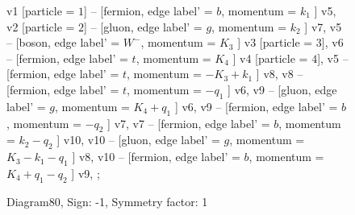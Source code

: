\documentclass{revtex4}
\begin{document}
\begin{figure}[!htb]
\begin{center}
{    %
v1 [particle = \(1\)] -- [fermion, edge label' = \(b\), momentum = \(k_{1}\) ] v5, 
v2 [particle = \(2\)] -- [gluon, edge label' = \(g\), momentum = \(k_{2}\) ] v7, 
v5 -- [boson, edge label' = \(W^{-}\), momentum = \(K_{3}\) ] v3 [particle = \(3\)], 
v6 -- [fermion, edge label' = \(t\), momentum = \(K_{4}\) ] v4 [particle = \(4\)], 
v5 -- [fermion, edge label' = \(t\), momentum = \(-K_{3} + k_{1}\) ] v8, 
v8 -- [fermion, edge label' = \(t\), momentum = \(-q_{1}\) ] v6, 
v9 -- [gluon, edge label' = \(g\), momentum = \(K_{4} + q_{1}\) ] v6, 
v9 -- [fermion, edge label' = \(b\), momentum = \(-q_{2}\) ] v7, 
v7 -- [fermion, edge label' = \(b\), momentum = \(k_{2} - q_{2}\) ] v10, 
v10 -- [gluon, edge label' = \(g\), momentum = \(K_{3} - k_{1} - q_{1}\) ] v8, 
v10 -- [fermion, edge label' = \(b\), momentum = \(K_{4} + q_{1} - q_{2}\) ] v9, 
};
\end{center}
\caption{Diagram80, Sign: -1, Symmetry factor: 1}
\end{figure}
\newpage
\end{document}
